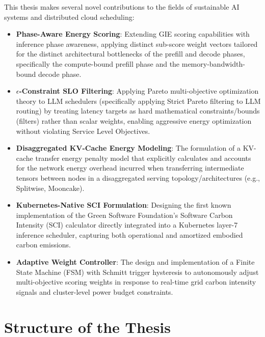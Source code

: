 \documentclass[12pt,a4paper,oneside]{report}
\begin{document}
This thesis makes several novel contributions to the fields of sustainable AI systems and distributed cloud scheduling:
\begin{itemize}
    \item \textbf{Phase-Aware Energy Scoring}: Extending GIE scoring capabilities with inference phase
awareness, applying distinct sub-score weight vectors tailored for the distinct architectural bottlenecks of the prefill and decode phases, specifically the compute-bound prefill phase and the memory-bandwidth-bound decode phase.
    \item \textbf{\(\epsilon\)-Constraint SLO Filtering}: Applying Pareto multi-objective optimization theory to LLM schedulers (specifically applying Strict Pareto filtering to LLM routing) by treating latency targets as hard mathematical constraints/bounds (filters) rather than scalar weights, enabling aggressive energy optimization without violating Service Level Objectives. 
    \item \textbf{Disaggregated KV-Cache Energy Modeling}: The formulation of a KV-cache transfer energy penalty model that explicitly calculates and accounts for the network energy overhead incurred when transferring intermediate tensors between nodes in a disaggregated serving topology/architectures (e.g., Splitwise, Mooncake).
    \item \textbf{Kubernetes-Native SCI Formulation}: Designing the first known implementation of the Green Software Foundation's Software Carbon Intensity (SCI) calculator directly integrated into a Kubernetes layer-7 inference scheduler, capturing both operational and amortized embodied carbon emissions.
    \item \textbf{Adaptive Weight Controller}: The design and implementation of a Finite State Machine (FSM) with Schmitt trigger hysteresis to autonomously adjust multi-objective scoring weights in response to real-time grid carbon intensity signals and cluster-level power budget constraints.
\end{itemize}

\section{Structure of the Thesis}
\label{sec:intro_structure}
\end{document}
